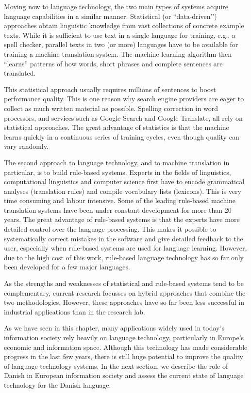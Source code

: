 \begin{multicols}{2}
Moving now to language technology, the two main types of systems acquire language capabilities in a similar manner. Statistical (or ``data-driven’') approaches obtain linguistic knowledge from vast collections of concrete example texts. While it is sufficient to use text in a single language for training, e.g., a spell checker, parallel texts in two (or more) languages have to be available for training a machine translation system. The machine learning algorithm then “learns” patterns of how words, short phrases and complete sentences are translated. 

This statistical approach usually requires millions of sentences to boost performance quality. This is one reason why search engine providers are eager to collect as much written material as possible. Spelling correction in word processors, and services such as Google Search and Google Translate, all rely on statistical approaches. The great advantage of statistics is that the machine learns quickly in a continuous series of training cycles, even though quality can vary randomly.

The second approach to language technology, and to machine translation in particular, is to build rule-based systems. Experts in the fields of linguistics, computational linguistics and computer science first have to encode grammatical analyses (translation rules) and compile vocabulary lists (lexicons). This is very time consuming and labour intensive. Some of the leading rule-based machine translation systems have been under constant development for more than 20 years. The great advantage of rule-based systems is that the experts have more detailed control over the language processing. This makes it possible to systematically correct mistakes in the software and give detailed feedback to the user, especially when rule-based systems are used for language learning. However, due to the high cost of this work, rule-based language technology has so far only been developed for a few major languages. 


As the strengths and weaknesses of statistical and rule-based systems tend to be complementary, current research focusses on hybrid approaches that combine the two methodologies. However, these approaches have so far been less successful in industrial applications than in the research lab. 

As we have seen in this chapter, many applications widely used in today’s information society rely heavily on language technology, particularly in Europe’s economic and information space. Although this technology has made considerable progress in the last few years, there is still huge potential to improve the quality of language technology systems. In the next section, we describe the role of Danish in European information society and assess the current state of language technology for the Danish language.
\end{multicols}

